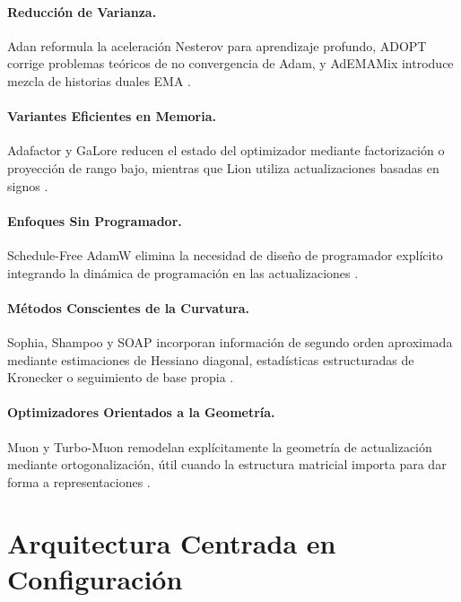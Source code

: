 \documentclass[11pt,a4paper]{article}
\begin{document}
\paragraph{Reducción de Varianza.}
Adan reformula la aceleración Nesterov para aprendizaje profundo, ADOPT corrige problemas teóricos de no convergencia de Adam, y AdEMAMix introduce mezcla de historias duales EMA \citep{xie_adan_2022,taniguchi_adopt_2024,pagliardini_ademamix_2024}.

\paragraph{Variantes Eficientes en Memoria.}
Adafactor y GaLore reducen el estado del optimizador mediante factorización o proyección de rango bajo, mientras que Lion utiliza actualizaciones basadas en signos \citep{shazeer_adafactor_2018,zhao_galore_2024,chen_symbolic_2023}.

\paragraph{Enfoques Sin Programador.}
Schedule-Free AdamW elimina la necesidad de diseño de programador explícito integrando la dinámica de programación en las actualizaciones \citep{defazio_road_2024}.

\paragraph{Métodos Conscientes de la Curvatura.}
Sophia, Shampoo y SOAP incorporan información de segundo orden aproximada mediante estimaciones de Hessiano diagonal, estadísticas estructuradas de Kronecker o seguimiento de base propia \citep{gupta_shampoo_2018,vyas_soap_2024,liu_sophia_2023}.

\paragraph{Optimizadores Orientados a la Geometría.}
Muon y Turbo-Muon remodelan explícitamente la geometría de actualización mediante ortogonalización, útil cuando la estructura matricial importa para dar forma a representaciones \citep{shen_convergence_2025,boissin_turbo-muon_2025}.

\section{Arquitectura Centrada en Configuración}
\end{document}
